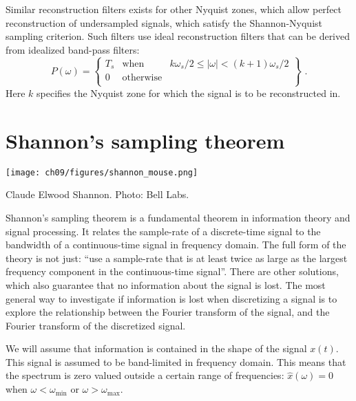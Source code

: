   Similar reconstruction filters exists for other Nyquist zones, which allow perfect 
  reconstruction of undersampled signals, which satisfy the Shannon-Nyquist sampling criterion. 
  Such filters use ideal reconstruction filters that can be derived from idealized band-pass filters:
  \begin{equation}
    P(\omega) = \left\{
    \begin{array}{rcr}
      T_s & \mathrm{when}      & k\omega_s/2 \le |\omega| < (k+1)\omega_s/2 \\
      0   & \mathrm{otherwise} &                                            \\
    \end{array}
    \right\} \,\,.
  \end{equation}
  Here $k$ specifies the Nyquist zone for which the signal is to be reconstructed in.
\fi

\section{Shannon's sampling theorem}
\begin{marginfigure}
  \begin{center}
    \texttt{[image: ch09/figures/shannon\_mouse.png]}
  \end{center}
  \caption{Claude Elwood Shannon. Photo: Bell Labs.}
\end{marginfigure}

Shannon's sampling theorem is a fundamental theorem in information theory and signal 
processing. 
It relates the sample-rate of a discrete-time signal to the bandwidth of a continuous-time signal in frequency domain.
The full form of the theory is not just: ``use a sample-rate that is at least twice as large as the largest 
frequency component in the continuous-time signal''. There are other solutions, which also guarantee that no 
information about the signal is lost.
The most general way to investigate if information is lost when discretizing a signal is to explore 
the relationship between the Fourier transform of the signal, and the Fourier transform of the discretized signal.

We will assume that information is contained in the shape of the signal $x(t)$. 
This signal is assumed to be band-limited in frequency domain.
This means that the spectrum is zero valued outside a certain range of frequencies: 
$\hat{x}(\omega) = 0$ when $\omega < \omega_{\mathrm{min}}$ or $\omega > \omega_{\mathrm{max}}$.

